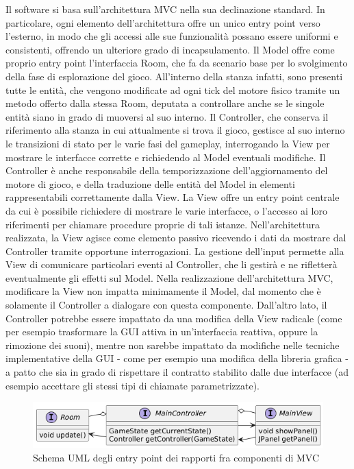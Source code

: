 \documentclass[a4paper,12pt]{report}
\begin{document}
Il software si basa sull’architettura MVC nella sua declinazione standard. In particolare, ogni elemento dell’architettura offre un unico entry point verso l’esterno, in modo che gli accessi alle sue funzionalità possano essere uniformi e consistenti, offrendo un ulteriore grado di incapsulamento.
%
\newline Il Model offre come proprio entry point l’interfaccia Room, che fa da scenario base per lo svolgimento della fase di esplorazione del gioco. All’interno della stanza infatti, sono presenti tutte le entità, che vengono modificate ad ogni tick del motore fisico tramite un metodo offerto dalla stessa Room, deputata a controllare anche se le singole entità siano in grado di muoversi al suo interno. 
%
\newline Il Controller, che conserva il riferimento alla stanza in cui attualmente si trova il gioco, gestisce al suo interno le transizioni di stato per le varie fasi del gameplay, interrogando la View per mostrare le interfacce corrette e richiedendo al Model eventuali modifiche. Il Controller è anche responsabile della temporizzazione dell’aggiornamento del motore di gioco, e della traduzione delle entità del Model in elementi rappresentabili correttamente dalla View.
%
\newline La View offre un entry point centrale da cui è possibile richiedere di mostrare le varie interfacce, o l’accesso ai loro riferimenti per chiamare procedure proprie di tali istanze. Nell’architettura realizzata, la View agisce come elemento passivo ricevendo i dati da mostrare dal Controller tramite opportune interrogazioni. La gestione dell’input permette alla View di comunicare particolari eventi al Controller, che li gestirà e ne rifletterà eventualmente gli effetti sul Model.
%
\newline Nella realizzazione dell’architettura MVC, modificare la View non impatta minimamente il Model, dal momento che è solamente il Controller a dialogare con questa componente. Dall’altro lato, il Controller potrebbe essere impattato da una modifica della View radicale (come per esempio trasformare la GUI attiva in un’interfaccia reattiva, oppure la rimozione dei suoni), mentre non sarebbe impattato da modifiche nelle tecniche implementative della GUI - come per esempio una modifica della libreria grafica - a patto che sia in grado di rispettare il contratto stabilito dalle due interfacce (ad esempio accettare gli stessi tipi di chiamate parametrizzate).


\begin{figure}[H]
	\centering{}
	\includegraphics[width=\textwidth]{img/mvc.png}
	\caption{Schema UML degli entry point dei rapporti fra componenti di MVC}
	\label{img:mvc}
\end{figure}
\end{document}
